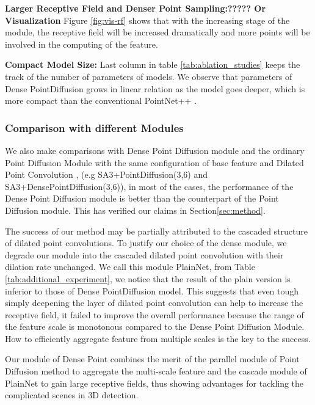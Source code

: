\documentclass[runningheads]{llncs}
\begin{document}
\textbf{Larger Receptive Field and Denser Point Sampling:????? Or Visualization} Figure \ref{fig:vis-rf} shows that with the increasing stage of the module, the receptive field will be increased dramatically and more points will be involved in the computing of the feature. 

\textbf{Compact Model Size:}
Last column in table \ref{tab:ablation_studies} keeps the track of  the number of parameters of models. We observe that parameters of Dense  PointDiffusion grows in linear relation as the model goes deeper, which is more compact than the conventional PointNet++ \cite{VoteNet}. 


\subsubsection{Comparison with different Modules}

We also make comparisons with Dense Point Diffusion module and the ordinary Point Diffusion Module with the same configuration of base feature and Dilated Point Convolution , (e.g SA3+PointDiffusion(3,6) and SA3+DensePointDiffusion(3,6)), in most of the cases, the performance of the Dense Point Diffusion module is better than the counterpart of the  Point Diffusion module. This has verified our claims  in Section\ref{sec:method}.

The success of our method may be partially attributed to the cascaded structure of dilated point  convolutions. To justify our choice of the dense module, we degrade our module into the cascaded dilated point convolution with their dilation rate unchanged. We call this module PlainNet, from Table \ref{tab:additional_experiment}, we notice that the result of the plain version is inferior to those of Dense PointDiffusion model. This suggests that even tough simply deepening the layer of dilated point  convolution can help to increase the receptive field, it failed to improve the overall performance because the range of the feature scale is monotonous compared to the Dense Point Diffusion Module. How to efficiently aggregate feature from multiple scales is the key to the success. 


Our module of Dense Point  combines the merit of the parallel module of Point Diffusion method to aggregate the multi-scale feature and the cascade module of PlainNet  to gain large receptive fields, thus showing advantages for tackling the complicated scenes in 3D detection. 
\end{document}

